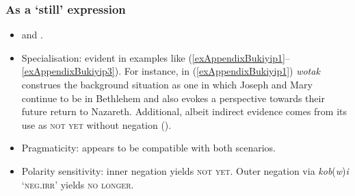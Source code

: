 \subsubsection{As a \lq{}still\rq{ }expression}
\begin{itemize}
	\item \textcite[41]{ConradWigoga1991} and \textcite[28, 31, 33]{Gerstner1963}.
	\item Specialisation: evident in examples like (\ref{exAppendixBukiyip1}–\ref{exAppendixBukiyip3}). For instance, in (\ref{exAppendixBukiyip1}) \textit{wotak} construes the background situation as one in which Joseph and Mary continue to be in Bethlehem and also evokes a perspective towards their future return to Nazareth. Additional, albeit indirect evidence comes from its use as \textsc{not yet} without negation ().
	\item Pragmaticity: appears to be  compatible with both scenarios.
	\item Polarity sensitivity: inner negation yields \textsc{not yet}. Outer negation via \textit{kob}(\textit{w})\textit{i} \lq \textsc{neg}.\textsc{irr}' yields \textsc{no longer}.
\end{itemize}

